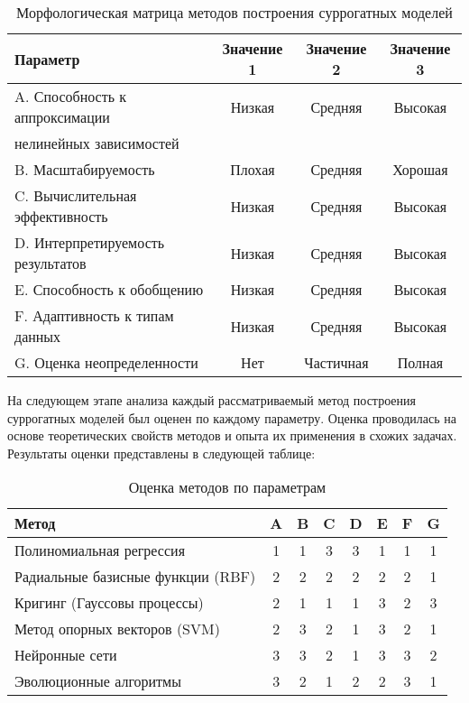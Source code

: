 \begin{table}[h]
    \centering
    \caption{Морфологическая матрица методов построения суррогатных моделей}
    \begin{tabular}{lccc}
        \midrule
        Параметр                          & Значение 1 & Значение 2 & Значение 3 \\
        \midrule
        A. Способность к аппроксимации    & Низкая     & Средняя    & Высокая    \\
        нелинейных зависимостей           &            &            &            \\

        B. Масштабируемость               & Плохая     & Средняя    & Хорошая    \\
        C. Вычислительная эффективность   & Низкая     & Средняя    & Высокая    \\
        D. Интерпретируемость результатов & Низкая     & Средняя    & Высокая    \\
        E. Способность к обобщению        & Низкая     & Средняя    & Высокая    \\
        F. Адаптивность к типам данных    & Низкая     & Средняя    & Высокая    \\
        G. Оценка неопределенности        & Нет        & Частичная  & Полная     \\
        \midrule
    \end{tabular}
    \label{tab:morphological_matrix}
\end{table}

На следующем этапе анализа каждый рассматриваемый метод
построения суррогатных моделей был оценен по каждому параметру.
Оценка проводилась на основе теоретических свойств методов и опыта
их применения в схожих задачах. Результаты оценки представлены в следующей таблице:

\begin{table}[h]
    \centering
    \caption{Оценка методов по параметрам}
    \begin{tabular}{l|c|c|c|c|c|c|c}
        \midrule
        Метод                             & A & B & C & D & E & F & G \\
        \midrule
        Полиномиальная регрессия          & 1 & 1 & 3 & 3 & 1 & 1 & 1 \\
        \hline
        Радиальные базисные функции (RBF) & 2 & 2 & 2 & 2 & 2 & 2 & 1 \\
        \hline
        Кригинг (Гауссовы процессы)       & 2 & 1 & 1 & 1 & 3 & 2 & 3 \\
        \hline
        Метод опорных векторов (SVM)      & 2 & 3 & 2 & 1 & 3 & 2 & 1 \\
        \hline
        Нейронные сети                    & 3 & 3 & 2 & 1 & 3 & 3 & 2 \\
        \hline
        Эволюционные алгоритмы            & 3 & 2 & 1 & 2 & 2 & 3 & 1 \\
        \midrule
    \end{tabular}
    \label{tab:method_evaluation}
\end{table}

